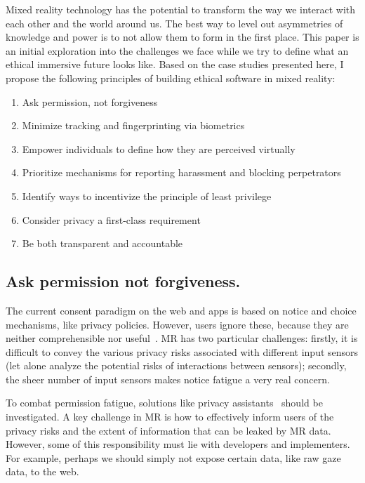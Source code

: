 Mixed reality technology has the potential to transform the way we interact with each other and the world around us. The best way to level out asymmetries of knowledge and power is to not allow them to form in the first place. This paper is an initial exploration into the challenges we face while we try to define what an ethical immersive future looks like. Based on the case studies presented here, I propose the following principles of building ethical software in mixed reality:

\begin{enumerate}
	\item Ask permission, not forgiveness
	\item Minimize tracking and fingerprinting via biometrics
	\item Empower individuals to define how they are perceived virtually
	\item Prioritize mechanisms for reporting harassment and blocking perpetrators
	\item Identify ways to incentivize the principle of least privilege
	\item Consider privacy a first-class requirement
	\item Be both transparent and accountable
\end{enumerate}

\subsection{Ask permission not forgiveness.} 
The current consent paradigm on the web and apps is based on notice and choice mechanisms, like privacy policies. However, users ignore these, because they are neither comprehensible nor useful~\cite{schaub}. MR has two particular challenges: firstly, it is difficult to convey the various privacy risks associated with different input sensors (let alone analyze the potential risks of interactions between sensors); secondly, the sheer number of input sensors makes notice fatigue a very real concern.

To combat permission fatigue, solutions like privacy assistants~\cite{liu2016follow} should be investigated. A key challenge in MR is how to effectively inform users of the privacy risks and the extent of information that can be leaked by MR data. However, some of this responsibility must lie with developers and implementers. For example, perhaps we should simply not expose certain data, like raw gaze data, to the web.

